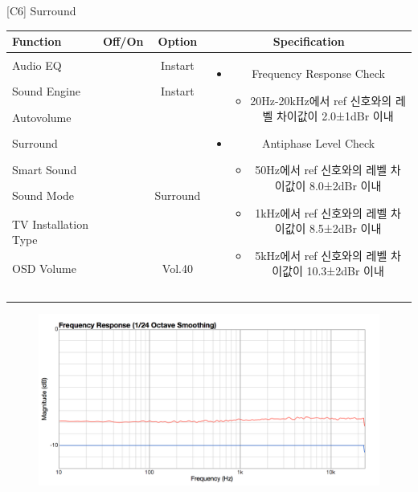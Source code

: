 \begin{frame}[t]{[C6] Surround}
\begin{tiny}
\begin{tabular}{@{}lccc@{}}
\toprule
Function & Off/On & Option & Specification \\
\midrule
Audio EQ & \color{black}{Off} & Instart &
\multirow{10}{60mm}{
\begin{itemize}\vspace{-3mm}
\item Frequency Response Check
	\begin{itemize}
	\item 20Hz-20kHz에서 ref 신호와의 레벨 차이값이 2.0±1dBr 이내	
	\end{itemize}
\item Antiphase Level Check
	\begin{itemize}
	\item 50Hz에서 ref 신호와의 레벨 차이값이 8.0±2dBr 이내
	\item 1kHz에서 ref 신호와의 레벨 차이값이 8.5±2dBr 이내
	\item 5kHz에서 ref 신호와의 레벨 차이값이 10.3±2dBr 이내
	\end{itemize}
\end{itemize}
} \\
Sound Engine & \color{blue}{On} & Instart & \\
Autovolume & \color{black}{Off} & & \\
Surround & \color{blue}{On} & & \\
Smart Sound & \color{black}{Off} & & \\
Sound Mode & \color{blue}{On} & Surround & \\
TV Installation Type & \color{blue}{On} & \color{black}{Standtype1} & \\
OSD Volume & \color{blue}{On} & Vol.40 & \\
& & & \\
& & & \\
& & & \\
& & & \\
\midrule
\end{tabular}
\end{tiny}

\begin{figure}[b]
\includegraphics[height=0.3\textwidth]{figures/surround.png}
\end{figure}

\end{frame}
